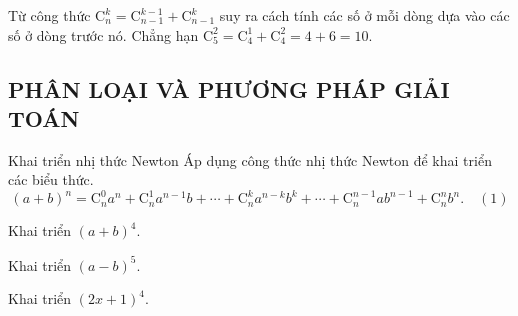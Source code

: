 \begin{note}
	Từ công thức $\mathrm{C}_n^k=\mathrm{C}_{n-1}^{k-1}+\mathrm{C}_{n-1}^k$ suy ra cách tính các số ở mỗi dòng dựa vào các số ở dòng trước nó. Chẳng hạn $\mathrm{C}_5^2=\mathrm{C}_4^1+\mathrm{C}_4^2=4+6=10$.
\end{note}
\subsection{PHÂN LOẠI VÀ PHƯƠNG PHÁP GIẢI TOÁN}
\begin{dang}{Khai triển nhị thức Newton}
	Áp dụng công thức nhị thức Newton để khai triển các biểu thức.
	$$\left(a+b\right)^n = \mathrm{C}_n^0a^n+\mathrm{C}_n^1a^{n-1}b+\cdots+\mathrm{C}_n^ka^{n-k}b^k+\cdots+\mathrm{C}_n^{n-1}ab^{n-1}+\mathrm{C}_n^nb^n.\quad (1)$$
\end{dang}
\begin{vd}%
	Khai triển $\left(a+b\right)^4$.
\end{vd}
\begin{vd}%
	Khai triển $\left(a-b\right)^5$.
\end{vd}
\begin{vd}%
	Khai triển $(2x+1)^4$.
\end{vd}
